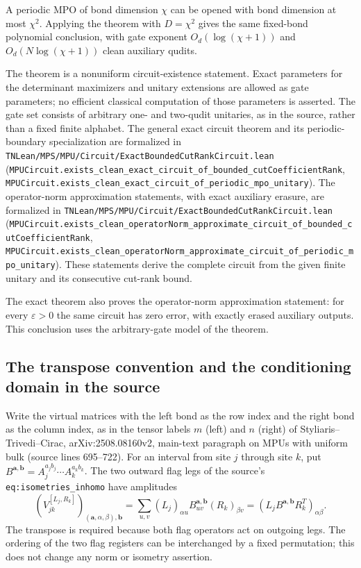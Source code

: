 \documentclass[11pt]{article}
\begin{document}
A periodic MPO of bond dimension $\chi$ can be opened with bond
dimension at most $\chi^2$. Applying the theorem with $D=\chi^2$
gives the same fixed-bond polynomial conclusion, with gate exponent
$O_d(\log(\chi+1))$ and $O_d(N\log(\chi+1))$ clean auxiliary qudits.

The theorem is a nonuniform circuit-existence statement. Exact
parameters for the determinant maximizers and unitary extensions
are allowed as gate parameters; no efficient classical computation
of those parameters is asserted. The gate set consists of arbitrary
one- and two-qudit unitaries, as in the source, rather than a fixed
finite alphabet. The general exact circuit theorem and its
periodic-boundary specialization are formalized in
\nolinkurl{TNLean/MPS/MPU/Circuit/ExactBoundedCutRankCircuit.lean}
(\nolinkurl{MPUCircuit.exists_clean_exact_circuit_of_bounded_cutCoefficientRank},
\nolinkurl{MPUCircuit.exists_clean_exact_circuit_of_periodic_mpo_unitary}).
The operator-norm approximation statements, with exact auxiliary erasure,
are formalized in
\nolinkurl{TNLean/MPS/MPU/Circuit/ExactBoundedCutRankCircuit.lean}
(\nolinkurl{MPUCircuit.exists_clean_operatorNorm_approximate_circuit_of_bounded_cutCoefficientRank},
\nolinkurl{MPUCircuit.exists_clean_operatorNorm_approximate_circuit_of_periodic_mpo_unitary}).
These statements derive the complete circuit from the given finite
unitary and its consecutive cut-rank bound.

The exact theorem also proves the operator-norm approximation statement:
for every $\varepsilon>0$ the same circuit has zero error, with exactly
erased auxiliary outputs. This conclusion uses the arbitrary-gate model
of the theorem.

\subsection*{The transpose convention and the conditioning domain in the source}

Write the virtual matrices with the left bond as the row index and the
right bond as the column index, as in the tensor labels $m$ (left) and $n$
(right) of Styliaris--Trivedi--Cirac, arXiv:2508.08160v2, main-text
paragraph on MPUs with uniform bulk (source lines 695--722).
For an interval from site $j$ through site $k$, put
$B^{\mathbf a,\mathbf b}=A_j^{a_jb_j}\cdots A_k^{a_kb_k}$.
The two outward flag legs of the source's
\nolinkurl{eq:isometries_inhomo} have amplitudes
\[
 (V_{jk}^{[L_j,R_k]})_{(\mathbf a,\alpha,\beta),\mathbf b}
 =\sum_{u,v}(L_j)_{\alpha u}
       B^{\mathbf a,\mathbf b}_{uv}(R_k)_{\beta v}
 =(L_j B^{\mathbf a,\mathbf b}R_k^T)_{\alpha\beta}.
\]
The transpose is required because both flag operators act on outgoing
legs. The ordering of the two flag registers can be interchanged by a
fixed permutation; this does not change any norm or isometry assertion.
\end{document}
